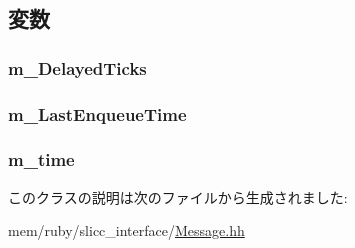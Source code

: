 \subsection{変数}
\hypertarget{classMessage_a905d53a402b92e02778dea8c4374a5f1}{
\subsubsection[{m\_\-DelayedTicks}]{ {\bf m\_\-DelayedTicks}}}
\label{classMessage_a905d53a402b92e02778dea8c4374a5f1}
\hypertarget{classMessage_ad90d632670cb643acb9003a49fb0a5a6}{
\subsubsection[{m\_\-LastEnqueueTime}]{ {\bf m\_\-LastEnqueueTime}}}
\label{classMessage_ad90d632670cb643acb9003a49fb0a5a6}
\hypertarget{classMessage_adb6d90850c7a231a52313b5bc7e5df68}{
\subsubsection[{m\_\-time}]{ {\bf m\_\-time}}}
\label{classMessage_adb6d90850c7a231a52313b5bc7e5df68}


このクラスの説明は次のファイルから生成されました:\begin{DoxyCompactItemize}
\item 
mem/ruby/slicc\_\-interface/\hyperlink{Message_8hh}{Message.hh}\end{DoxyCompactItemize}
